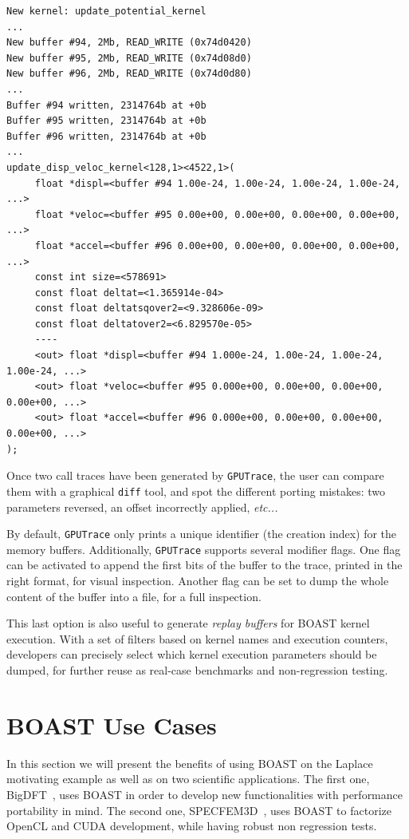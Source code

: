 \documentclass{IEEEtran}
\newcommand{\latin}[1]{\textit{#1}}
\newcommand{\etc}[1]{\latin{etc...}}
\newcommand{\code}[1]{\texttt{#1}}
\begin{document}
\begin{lstlisting}
New kernel: update_potential_kernel
...
New buffer #94, 2Mb, READ_WRITE (0x74d0420)
New buffer #95, 2Mb, READ_WRITE (0x74d08d0)
New buffer #96, 2Mb, READ_WRITE (0x74d0d80)
...
Buffer #94 written, 2314764b at +0b 
Buffer #95 written, 2314764b at +0b
Buffer #96 written, 2314764b at +0b
...
update_disp_veloc_kernel<128,1><4522,1>(
     float *displ=<buffer #94 1.00e-24, 1.00e-24, 1.00e-24, 1.00e-24, ...>
     float *veloc=<buffer #95 0.00e+00, 0.00e+00, 0.00e+00, 0.00e+00, ...>
     float *accel=<buffer #96 0.00e+00, 0.00e+00, 0.00e+00, 0.00e+00, ...>
     const int size=<578691>
     const float deltat=<1.365914e-04>
     const float deltatsqover2=<9.328606e-09>
     const float deltatover2=<6.829570e-05>
     ----
     <out> float *displ=<buffer #94 1.000e-24, 1.00e-24, 1.00e-24, 1.00e-24, ...>
     <out> float *veloc=<buffer #95 0.000e+00, 0.00e+00, 0.00e+00, 0.00e+00, ...>
     <out> float *accel=<buffer #96 0.000e+00, 0.00e+00, 0.00e+00, 0.00e+00, ...>
);
\end{lstlisting}

Once two call traces have been generated by \code{GPUTrace}, the user can
compare them with a graphical \code{diff} tool, and spot the different porting
mistakes: two parameters reversed, an offset incorrectly applied, \etc{}

By default, \code{GPUTrace} only prints a unique identifier (the creation index)
for the memory buffers.  Additionally, \code{GPUTrace} supports several modifier
flags. One flag can be activated to append the first bits of the buffer to the
trace, printed in the right format, for visual inspection. Another flag can be
set to dump the whole content of the buffer into a file, for a full inspection.

This last option is also useful to generate \emph{replay buffers} for BOAST
kernel execution. With a set of filters based on kernel names and execution
counters, developers can precisely select which kernel execution parameters
should be dumped, for further reuse as real-case benchmarks and non-regression
testing.

\section{BOAST Use Cases\label{use_cases}}

In this section we will present the benefits of using BOAST on the Laplace
motivating example as well as on two scientific applications. The first one,
BigDFT~\cite{genovese2008daubechies}, uses BOAST in order to develop new
functionalities with performance portability in mind. The second one,
SPECFEM3D~\cite{komatitsch2011fluid}, uses BOAST to factorize OpenCL and CUDA
development, while having robust non regression tests.
\end{document}
